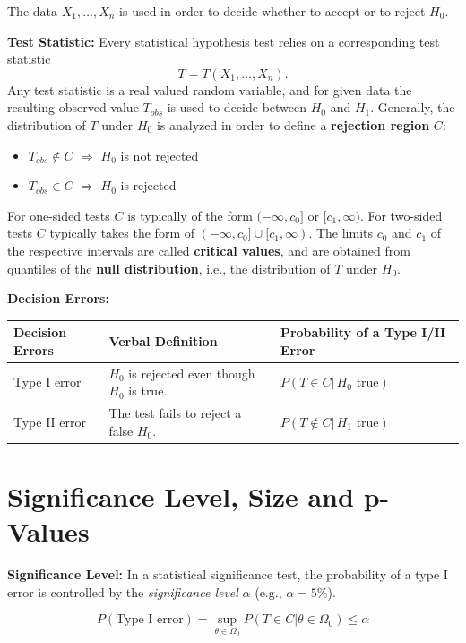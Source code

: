 \documentclass[]{book}
\providecommand{\tightlist}{%
  \setlength{\itemsep}{0pt}\setlength{\parskip}{0pt}}
\theoremstyle{definition}
\theoremstyle{definition}
\theoremstyle{definition}
\theoremstyle{remark}
\begin{document}
The data \(X_1,\dots,X_n\) is used in order to decide whether to accept or to reject \(H_0\).

\textbf{Test Statistic:}
Every statistical hypothesis test relies on a corresponding test statistic
\[T=T(X_1,\dots,X_n).\]
Any test statistic is a real valued random variable, and for given data the resulting observed value \(T_{obs}\) is used to decide between
\(H_0\) and \(H_1\). Generally, the distribution of \(T\) under \(H_0\) is analyzed in order to define a \textbf{rejection region} \(C\):

\begin{itemize}
\tightlist
\item
  \(T_{obs}\not\in C\) \(\Rightarrow\) \(H_0\) is not rejected
\item
  \(T_{obs}\in C\) \(\Rightarrow\) \(H_0\) is rejected
\end{itemize}

For one-sided tests \(C\) is typically of the form \((-\infty,c_0]\) or \([c_1,\infty)\).
For two-sided tests \(C\) typically takes the form of \((-\infty,c_0]\cup [c_1,\infty)\).
The limits \(c_0\) and \(c_1\) of the respective intervals are called \textbf{critical values},
and are obtained from quantiles of the \textbf{null distribution}, i.e., the distribution of \(T\) under \(H_0\).

\textbf{Decision Errors:}

\begin{longtable}[]{@{}lll@{}}
\toprule
Decision Errors & Verbal Definition & Probability of a Type I/II Error\tabularnewline
\midrule
\endhead
Type I error & \(H_0\) is rejected even though \(H_0\) is true. & \(P(T\in C |\,H_0\text{ true})\)\tabularnewline
Type II error & The test fails to reject a false \(H_0\). & \(P(T\not\in C |\,H_1\text{ true})\)\tabularnewline
\bottomrule
\end{longtable}

\hypertarget{significance-level-size-and-p-values}{%
\section{Significance Level, Size and p-Values}\label{significance-level-size-and-p-values}}

\textbf{Significance Level:}
In a statistical significance test, the probability of a type I error is controlled by the \emph{significance level} \(\alpha\) (e.g., \(\alpha=5\%\)).

\[P\left(\text{Type I error}\right)=\sup_{\theta\in\Omega_0} P(T\in C|\theta\in\Omega_0)\leq \alpha\]
\end{document}
